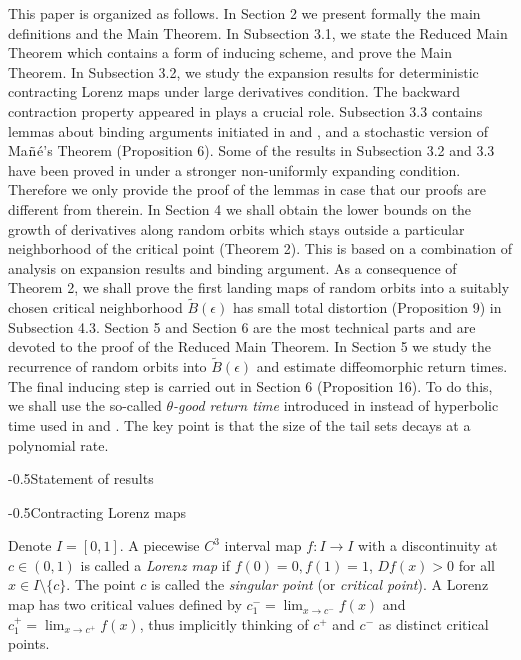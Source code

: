 \documentclass[11pt,oneside]{article}
\makeatletter
\theoremstyle{plain}
\numberwithin{equation}{section}
\numberwithin{figure}{section}
\numberwithin{table}{section}
\renewcommand{\section}{\@startsection{section}{1}{0mm}
{-\baselineskip}{0.5\baselineskip}{\Large\bf\leftline}}
\renewcommand{\subsection}{\@startsection{subsection}{1}{0mm}
{-\baselineskip}{0.5\baselineskip}{\large\bf\leftline}}
\makeatother
\begin{document}
This paper is organized as follows. In Section 2 we present formally the main definitions and the Main Theorem. In Subsection 3.1, we state the Reduced Main Theorem which contains a form of inducing scheme, and prove the Main Theorem. In Subsection 3.2, we study the expansion results for deterministic contracting Lorenz maps under large derivatives condition. The backward contraction property appeared in \cite{BRSS} plays a crucial role. Subsection 3.3 contains lemmas about binding arguments initiated in \cite{BC} and \cite{Ts}, and a stochastic version of Ma${\rm \tilde{n}}$\'e's Theorem (Proposition 6). Some of the results in Subsection 3.2 and 3.3 have been proved in \cite{LR} under a stronger non-uniformly expanding condition. Therefore we only provide the proof of the lemmas in case that our proofs are different from therein. In Section 4 we shall obtain the lower bounds on the growth of derivatives along random orbits which stays outside a particular neighborhood of the critical point (Theorem 2). This is based on a combination of analysis on expansion  results and binding argument. As a consequence of Theorem 2, we shall prove the first landing maps of random orbits into a suitably chosen critical neighborhood $\tilde B(\epsilon)$ has small total distortion (Proposition 9) in Subsection 4.3. Section 5 and Section 6 are the most technical parts and are devoted to the proof of the Reduced Main Theorem. In Section 5 we study the recurrence of random orbits into $\tilde B(\epsilon)$ and estimate diffeomorphic return times. The final inducing step is carried out in Section 6 (Proposition 16). To do this, we shall use the so-called {\it $\theta$-good return time}  introduced in \cite{S} instead of hyperbolic time used in \cite{AV} and \cite{LR}. The key point is that the size of the tail sets decays at a polynomial rate.




\section{Statement of results}

\subsection{Contracting Lorenz maps}


Denote $I=[0, 1]$. A piecewise $C^3$ interval map $f: I \to I$ with a discontinuity at $c \in (0, 1)$ is called a {\it Lorenz map} if $f(0) =0, f(1) =1$, $Df(x) >0$ for all $x \in I \setminus \{ c\}$. The point $c$ is called the {\it singular point} (or {\it critical point}). A Lorenz map has two critical values defined by $c_1^- = \lim_{x \to c^-}f(x)$ and $c_1^+ = \lim_{x \to c^+}f(x)$, thus implicitly thinking of $c^+$ and $c^-$ as distinct critical points. 
\end{document}
